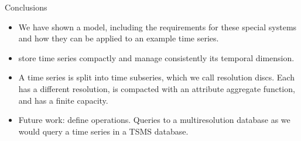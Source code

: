 \begin{frame}{Conclusions}

  \begin{itemize}

  \item We have shown a  model, including the requirements
    for these special systems and how they can be applied to an
    example time series.

  \item {} store time series compactly and manage
    consistently its temporal dimension.

  \item A time series is split into time subseries, which we call
    resolution discs. Each has a different resolution, is compacted
    with an attribute aggregate function, and has a finite capacity.


  \item Future work: define operations. Queries to a multiresolution
    database as we would query a time series in a TSMS database.



  \end{itemize}

\end{frame}



